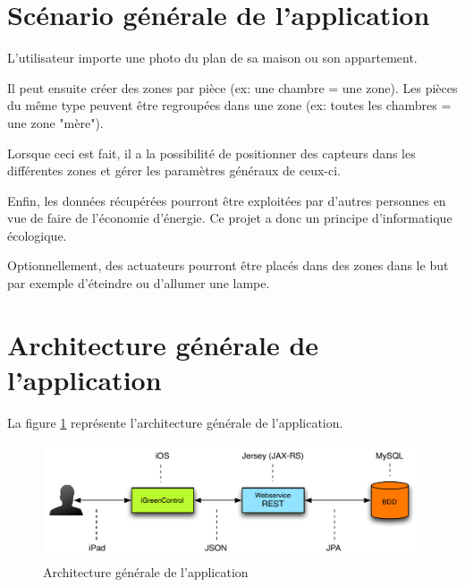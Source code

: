 
\section{Scénario générale de l'application} %
\label{sub:concept_de_l_application}
L'utilisateur importe une photo du plan de sa maison ou son appartement. 

\medskip

Il peut ensuite créer des zones par pièce (ex: une chambre = une zone). Les pièces du même type peuvent être regroupées dans une zone (ex: toutes les chambres = une zone "mère").

\medskip

Lorsque ceci est fait, il a la possibilité de positionner des capteurs dans les différentes zones et gérer les paramètres généraux de ceux-ci.

\medskip

Enfin, les données récupérées pourront être exploitées par d'autres personnes en vue de faire de l'économie d'énergie. Ce projet a donc un principe d'informatique écologique. 

\medskip

Optionnellement, des actuateurs pourront être placés dans des zones dans le but par exemple d'éteindre ou d'allumer une lampe.


\section{Architecture générale de l'application} %
\label{sub:architecture_g_n_rale_de_l_application}
La figure \ref{gra:archiGenerale} représente l'architecture générale de l'application.
\begin{figure}[H]
    	\centering
    	\includegraphics[width=\textwidth]{00_media/02_archi.pdf}
    	\caption{Architecture générale de l'application}
    	\label{gra:archiGenerale}
\end{figure}


